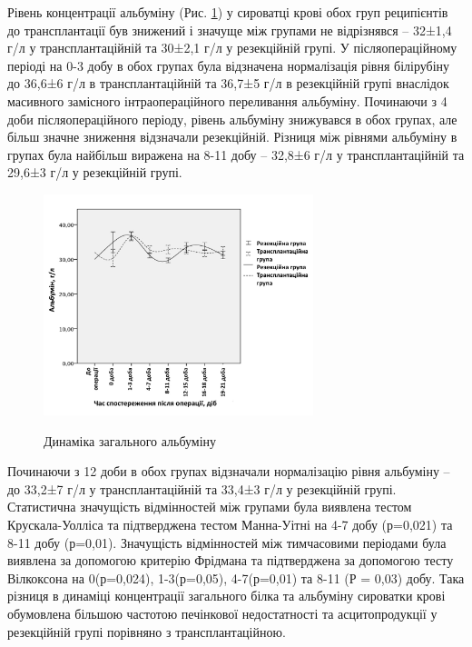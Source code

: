 Рівень концентрації альбуміну (Рис. \ref{fig:alb}) у сироватці крові обох груп реципієнтів до трансплантації був знижений і значуще між групами не відрізнявся – 32±1,4 г/л у трансплантаційній та 30±2,1 г/л у резекційній групі. У післяопераційному періоді на 0-3 добу в обох групах була відзначена нормалізація рівня білірубіну до 36,6±6 г/л в трансплантаційній та 36,7±5 г/л в резекційній групі внаслідок масивного замісного інтраопераційного переливання альбуміну. Починаючи з 4 доби післяопераційного періоду, рівень альбуміну знижувався в обох групах, але більш значне зниження відзначали резекційній. Різниця між рівнями альбуміну в групах була найбільш виражена на 8-11 добу – 32,8±6 г/л у трансплантаційній та 29,6±3 г/л у резекційній групі.

\begin{figure}[h]
\caption{Динаміка загального альбуміну}
\centering
\includegraphics[width=0.7\textwidth]{Illustrations/graf/alb.jpeg}
\label{fig:alb} 
\end{figure}

Починаючи з 12 доби в обох групах відзначали нормалізацію рівня альбуміну – до 33,2±7 г/л у трансплантаційній та 33,4±3 г/л у резекційній групі. Статистична значущість відмінностей між групами була виявлена тестом Крускала-Уолліса та підтверджена тестом Манна-Уітні на 4-7 добу (р=0,021) та 8-11 добу (р=0,01). Значущість відмінностей між тимчасовими періодами була виявлена за допомогою критерію Фрідмана та підтверджена за допомогою тесту Вілкоксона на 0(р=0,024), 1-3(р=0,05), 4-7(р=0,01) та 8-11 (Р = 0,03) добу. Така різниця в динаміці концентрації загального білка та альбуміну сироватки крові обумовлена більшою частотою печінкової недостатності та асцитопродукції у резекційній групі порівняно з трансплантаційною.

